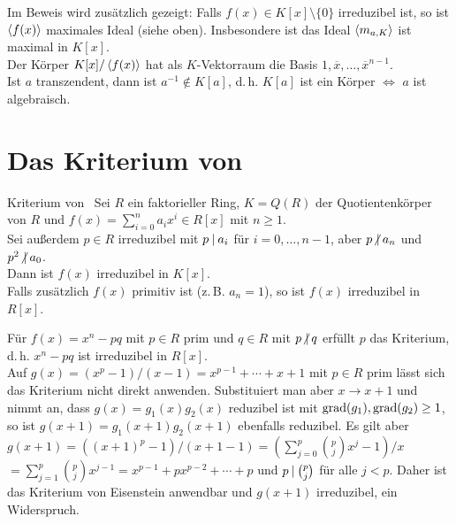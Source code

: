 \begin{Bem}
    Im Beweis wird zusätzlich gezeigt:
    Falls $f(x) \in K[x] \setminus \{0\}$ irreduzibel ist,
    so ist $\left\langle f(x)\right\rangle$ maximales Ideal (siehe oben).
    Insbesondere ist das Ideal $\left\langle m_{a,K}\right\rangle$ ist maximal in $K[x]$.\\
    Der Körper $K[x]/\left\langle f(x)\right\rangle$ hat als $K$-Vektorraum die Basis
    $1, \overline{x}, \dotsc, \overline{x}^{n-1}$.\\
    Ist $a$ transzendent, dann ist $a^{-1} \notin K[a]$, d.\,h.
    $K[a]$ ist ein Körper $\iff$ $a$ ist algebraisch.
\end{Bem}

\pagebreak

\section{%
    Das Kriterium von %
}

\begin{Theorem}{Kriterium von \upshape\,\!}
    Sei $R$ ein faktorieller Ring,
    $K = Q(R)$ der Quotientenkörper von $R$ und
    $f(x) = \sum_{i=0}^n a_i x^i \in R[x]$ mit $n \ge 1$.\\
    Sei außerdem $p \in R$ irreduzibel mit $p \mathbin{|} a_i$ für
    $i = 0, \dotsc, n - 1$, aber
    $p \mathbin{\!\not|} a_n$ und $p^2 \mathbin{\!\not|} a_0$.\\
    Dann ist $f(x)$ irreduzibel in $K[x]$.\\
    Falls zusätzlich $f(x)$ primitiv ist (z.\,B. $a_n = 1$), so ist
    $f(x)$ irreduzibel in $R[x]$.
\end{Theorem}

\begin{Bsp}
    Für $f(x) = x^n - pq$ mit $p \in R$ prim und $q \in R$ mit $p \mathbin{\!\not|} q$
    erfüllt $p$ das Kriterium, d.\,h. $x^n - pq$ ist irreduzibel in $R[x]$.\\
    Auf $g(x) = (x^p - 1)/(x - 1) = x^{p-1} + \dotsb + x + 1$
    mit $p \in R$ prim lässt sich das Kriterium nicht direkt anwenden.
    Substituiert man aber $x \rightarrow x + 1$ und nimmt an, dass
    $g(x) = g_1(x) g_2(x)$ reduzibel ist mit $\operatorname{grad}(g_1), \operatorname{grad}(g_2) \ge 1$,
    so ist $g(x + 1) = g_1(x + 1) g_2(x + 1)$ ebenfalls reduzibel.
    Es gilt aber $g(x + 1) = ((x + 1)^p - 1) / (x + 1 - 1) =
    \left(\sum_{j=0}^p \binom{p}{j} x^j - 1\right) / x$\\
    $= \sum_{j=1}^p \binom{p}{j} x^{j-1} =
    x^{p-1} + p x^{p-2} + \dotsb + p$
    und $p \mathbin{|} \binom{p}{j}$ für alle $j < p$.
    Daher ist das Kriterium von Eisenstein anwendbar und $g(x + 1)$
    irreduzibel, ein Widerspruch.
\end{Bsp}

